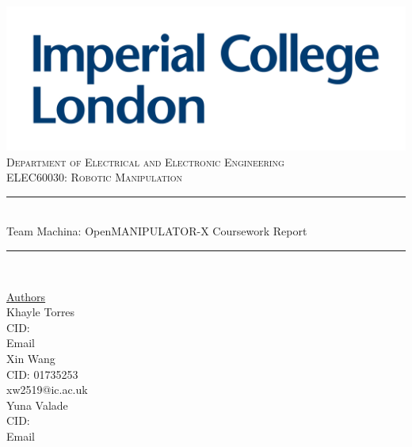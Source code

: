 \documentclass[10pt, a4paper]{article}
\begin{document}
\begin{titlepage}
	\newcommand{\HRule}{\rule{\linewidth}{0.5mm}}
    \includegraphics[scale=0.1]{./Images/Imperial_Logo.jpg} 
    \\
    \center 
	\textsc{\large Department of Electrical and Electronic Engineering }\\[0.5cm] 
	\textsc{\normalsize ELEC60030: Robotic Manipulation}\\[0.5cm] 
    
	\HRule \\[0.4cm]
	Team Machina: OpenMANIPULATOR-X Coursework Report
    \HRule \\[1.5cm]
     
    \begin{center}
		\underline{Authors}\\[0.5cm] 
        Khayle Torres \\ CID:  \\ Email \\ [0.5cm]

        Xin Wang \\ CID: 01735253 \\ xw2519@ic.ac.uk \\ [0.5cm]
        
        Yuna Valade \\ CID:  \\ Email \\ [0.5cm]

	\end{center} \large

    \vfill 
    \makeatletter
    \@date 
    \makeatother
\end{titlepage}

\renewcommand{\baselinestretch}{0.75}\normalsize
\tableofcontents
\renewcommand{\baselinestretch}{1.0}\normalsize

\pagebreak
\end{document}
